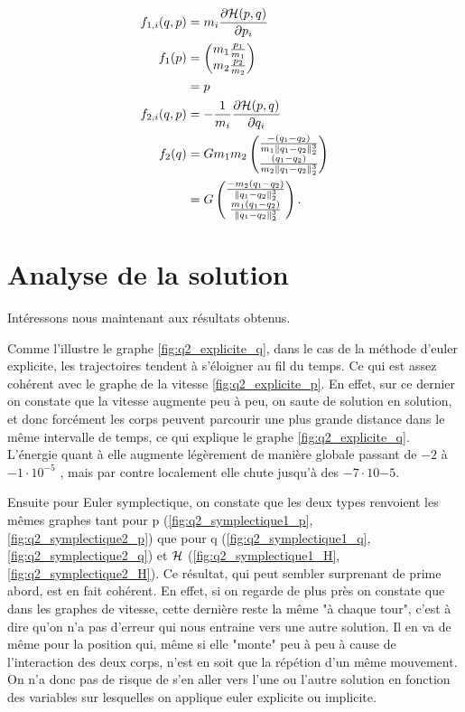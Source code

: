 \begin{align*}
 f_{1,i}(q,p) &= m_i \fpart{\Ha(p,q)}{p_i} \\	
  f_1(p) & =
  \begin{pmatrix}
    m_1\frac{p_1}{m_1}\\
    m_2\frac{p_2}{m_2}
  \end{pmatrix}\\
  & = p\\
%	
 f_{2,i}(q,p) &= -\frac{1}{m_i}\fpart{\Ha(p,q)}{q_i} \\
  f_2(q) & = Gm_1m_2
  \begin{pmatrix}
    \frac{-(q_1-q_2)}{m_1\|q_1-q_2\|_2^3}\\
    \frac{(q_1-q_2)}{m_2\|q_1-q_2\|_2^3}
  \end{pmatrix}\\
  & = G
  \begin{pmatrix}
    \frac{-m_2 (q_1-q_2)}{\|q_1-q_2\|_2^3}\\
    \frac{m_1 (q_1-q_2)}{\|q_1-q_2\|_2^3}
  \end{pmatrix}.
\end{align*}


\section{Analyse de la solution}

Intéressons nous maintenant aux résultats obtenus. 

	Comme l'illustre le graphe \ref{fig:q2_explicite_q}, dans le cas de la méthode d'euler explicite, les trajectoires tendent à s'éloigner au fil du temps. Ce qui est assez cohérent avec le graphe de la vitesse \ref{fig:q2_explicite_p}. En effet, sur ce dernier on constate que la vitesse augmente peu à peu, on saute de solution en solution, et donc forcément les corps peuvent parcourir une plus grande distance dans le même intervalle de temps, ce qui explique le graphe \ref{fig:q2_explicite_q}. L'énergie quant à elle augmente légèrement de manière globale  passant de $-2$ à $-1 \cdot 10^{-5}$ , mais par contre localement elle chute jusqu'à des $-7 \cdot 10{-5}$. 
	
	Ensuite pour Euler symplectique, on constate que les deux types renvoient les mêmes graphes tant pour p (\ref{fig:q2_symplectique1_p}, \ref{fig:q2_symplectique2_p}) que pour q (\ref{fig:q2_symplectique1_q}, \ref{fig:q2_symplectique2_q})  et $\mathcal{H}$ (\ref{fig:q2_symplectique1_H}, \ref{fig:q2_symplectique2_H}). Ce résultat, qui peut sembler surprenant de prime abord, est en fait cohérent. En effet, si on regarde de plus près on constate que dans les graphes de vitesse, cette dernière reste la même "à chaque tour", c'est à dire qu'on n'a pas d'erreur qui nous entraine vers une autre solution. Il en va de même pour la position qui, même si elle "monte" peu à peu à cause de l'interaction des deux corps, n'est en soit que la répétion d'un même mouvement. On n'a donc pas de risque de s'en aller vers l'une ou l'autre solution en fonction des variables sur lesquelles on applique euler explicite ou implicite.    



